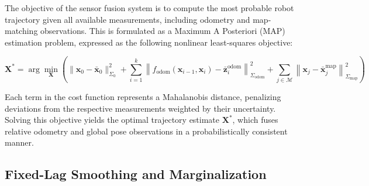 The objective of the sensor fusion system is to compute the most probable robot trajectory given all available measurements, including odometry and map-matching observations. This is formulated as a Maximum A Posteriori (MAP) estimation problem, expressed as the following nonlinear least-squares objective:

\begin{equation}
	\mathbf{X}^* = \arg\min_{\mathbf{X}} \left(
	\| \mathbf{x}_0 - \bar{\mathbf{x}}_0 \|^2_{\Sigma_0} +
	\sum_{i=1}^{k} \left\| f_{\text{odom}}(\mathbf{x}_{i-1}, \mathbf{x}_i) - \bar{\mathbf{z}}_i^{\text{odom}} \right\|^2_{\Sigma_{\text{odom}}} +
	\sum_{j \in \mathcal{M}} \left\| \mathbf{x}_j - \bar{\mathbf{x}}_j^{\text{map}} \right\|^2_{\Sigma_{\text{map}}}
	\right)
	\label{eq:map-estimation}
\end{equation}

Each term in the cost function represents a Mahalanobis distance, penalizing deviations from the respective measurements weighted by their uncertainty. Solving this objective yields the optimal trajectory estimate \( \mathbf{X}^* \), which fuses relative odometry and global pose observations in a probabilistically consistent manner.


\subsection{Fixed-Lag Smoothing and Marginalization}

